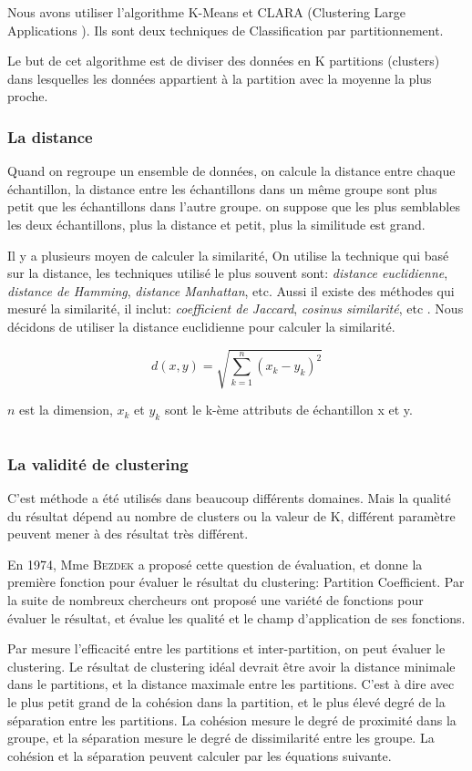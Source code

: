 Nous avons utiliser l'algorithme K-Means et CLARA (Clustering Large Applications ). Ils sont deux techniques de Classification par partitionnement.

Le but de cet algorithme est de diviser des données en K partitions (clusters) dans lesquelles les données appartient à la partition avec la moyenne la plus proche. 

\subsubsection{La distance}

Quand on regroupe un ensemble de données, on calcule la distance entre chaque échantillon, la distance entre les échantillons dans un même groupe sont plus petit que les échantillons dans l'autre groupe. on suppose que les plus semblables les deux échantillons, plus la distance et petit, plus la similitude est grand.


Il y a plusieurs moyen de calculer la similarité, On utilise la technique qui basé sur la distance, les techniques utilisé le plus souvent sont: \emph{distance euclidienne}, \emph{distance de Hamming}, \emph{distance Manhattan}, etc. Aussi il existe des méthodes qui mesuré la similarité, il inclut: \emph{coefficient de Jaccard}, \emph{cosinus similarité}, etc . Nous décidons de utiliser la distance euclidienne pour calculer la similarité.

$$d(x,y) = \sqrt {\sum_{k=1}^n  (x_{k}-y_{k})^2}$$

$n$ est la dimension, $x_{k}$ et $ y_{k}$ sont le k-ème attributs de échantillon x et y.

$$ $$
\subsubsection{La validité de clustering}
C'est méthode a été utilisés dans beaucoup différents domaines. Mais la qualité du résultat dépend au nombre de clusters ou la valeur de K, différent paramètre peuvent mener à des résultat très différent.

En 1974, Mme \textsc{Bezdek} a proposé cette question de évaluation, et donne la première fonction pour évaluer le résultat du clustering: \textsf{Partition}  \textsf{Coefficient}. Par la suite de nombreux chercheurs ont proposé une variété de fonctions pour évaluer le résultat, et évalue les qualité et le champ d'application de ses fonctions. 

Par mesure l'efficacité entre les partitions et inter-partition, on peut évaluer le clustering. Le résultat de clustering idéal devrait être avoir la distance minimale dans le partitions, et la distance maximale entre les partitions. C'est à dire avec le plus petit grand de la cohésion dans la partition, et le plus élevé degré de la séparation entre les partitions. La cohésion mesure le degré de proximité dans la groupe, et la séparation mesure le degré de dissimilarité entre les groupe. La cohésion et la séparation peuvent calculer par les équations suivante.

